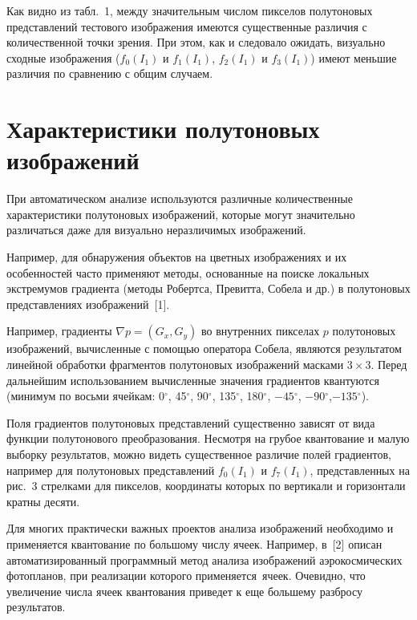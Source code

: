 \begin{multicols}{2}
  Как видно из табл.~1, между значительным чис\-лом пикселов полутоновых
представлений тестового изображения имеются существенные различия с
количественной точки зрения. При этом, как и следовало ожидать, визуально
сходные изображения ($f_0(I_1)$ и $f_1(I_1)$, $f_2(I_1)$ и $f_3(I_1)$) имеют
меньшие различия по сравнению с общим случаем.

\section{Характеристики полутоновых изображений}

  При автоматическом анализе используются различ\-ные количественные
характеристики полутоновых изображений, которые могут значительно
различаться даже для визуально неразличимых изоб\-ра\-жений.

  Например, для обнаружения объектов на цветных изображениях и их
особенностей часто применяют методы, основанные на поиске локальных
экстремумов градиента (методы Робертса, Превитта, Собела и др.) в
полутоновых представлениях изображений~[1].

  Например, градиенты $\nabla p = (G_x, G_y)$ во внут\-рен\-них пикселах $p$
полутоновых изображений, вычисленные с помощью оператора Собела,
являются результатом линейной обработки фрагментов полутоновых
изображений масками $3\times 3$. Перед дальнейшим использованием
вычисленные значения градиентов квантуются (минимум по восьми ячейкам:
0$^\circ$, 45$^\circ$, 90$^\circ$, 135$^\circ$, 180$^\circ$, $-45$$^\circ$, $-
90$$^\circ$,\linebreak $-135$$^\circ$).

  Поля градиентов полутоновых представлений существенно зависят от вида
функции полутонового преобразования. Несмотря на грубое квантование и
малую выборку результатов, можно \mbox{видеть} существенное различие полей
градиентов, например для полутоновых представлений $f_0(I_1)$ и $f_7(I_1)$,
 представленных на рис.~3 стрелками для пикселов, координаты которых
по вертикали и горизонтали кратны десяти.

  Для многих практически важных проектов анализа изображений необходимо
и применяется квантование по большому числу ячеек. Например, в~[2] описан
автоматизированный программный метод анализа изображений
аэрокосмических фотопланов, при реализации которого применяется~ячеек. Очевидно, что увеличение числа ячеек квантования
приведет к еще большему разбросу результатов.


\end{multicols}
